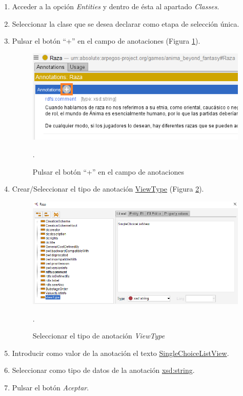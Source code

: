 \begin{enumerate}
    \item Acceder a la opción \textit{Entities} y dentro de ésta al apartado \textit{Classes}.
    \item Seleccionar la clase que se desea declarar como etapa de selección única.
    \item Pulsar el botón “+” en el campo de anotaciones (Figura \ref*{UniqueSelection_1}).
    \begin{figure}[ht]
        \centering
        \includegraphics[scale=0.6]{Figures/Protege/UniqueSelection_1.png}
        \caption{Pulsar el botón “+” en el campo de anotaciones}.
        \label{UniqueSelection_1}
    \end{figure}

    \item Crear/Seleccionar el tipo de anotación \underline{ViewType} (Figura \ref*{UniqueSelection_2}).
    \begin{figure}[ht]
        \centering
        \includegraphics[scale=0.6]{Figures/Protege/UniqueSelection_2.png}
        \caption{Seleccionar el tipo de anotación \textit{ViewType}}.
        \label{UniqueSelection_2}
    \end{figure}

    \item Introducir como valor de la anotación el texto \underline{SingleChoiceListView}.
    \item Seleccionar como tipo de datos de la anotación \underline{xsd:string}.
    \item Pulsar el botón \textit{Aceptar}.
\end{enumerate}

